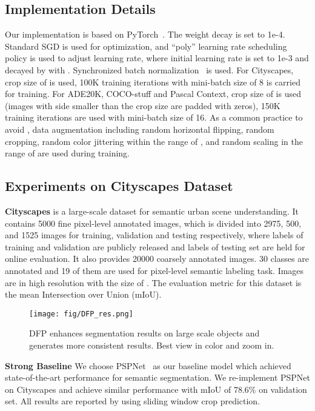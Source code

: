 \documentclass[letterpaper]{article} \usepackage{aaai20}  \usepackage{times}  \usepackage{helvet} \usepackage{courier}  \usepackage[hyphens]{url}  \usepackage{graphicx} \urlstyle{rm} \def\UrlFont{\rm}  \usepackage{graphicx}  \usepackage{amsmath}
\begin{document}
\subsection{Implementation Details}
Our implementation is based on PyTorch~\cite{pytorch}. The weight decay is set to 1e-4. Standard SGD is used for optimization, and ``poly'' learning rate scheduling policy is used to adjust learning rate, where initial learning rate is set to 1e-3 and decayed by 
 with . 
Synchronized batch normalization~\cite{context_encoding} is used. For Cityscapes, crop size of  is used, 100K training iterations with mini-batch size of 8 is carried for training. For ADE20K, COCO-stuff and Pascal Context, crop size of  is used (images with side smaller than the crop size are padded with zeros), 150K training iterations are used with mini-batch size of 16. As a common practice to avoid , data augmentation including random horizontal flipping, random cropping, random color jittering within the range of , and random scaling in the range of  are used during training. 

\subsection{Experiments on Cityscapes Dataset}
\textbf{Cityscapes} is a large-scale dataset for semantic urban scene understanding. It contains 5000 fine pixel-level annotated images, which is divided into 2975, 500, and 1525 images for training, validation and testing respectively, where labels of training and validation are publicly released and labels of testing set are held for online evaluation. It also provides 20000 coarsely annotated images. 30 classes are annotated and 19 of them are used for pixel-level semantic labeling task. Images are in high resolution with the size of . The evaluation metric for this dataset is the mean Intersection over Union (mIoU).





\begin{figure}
\centering
\texttt{[image: fig/DFP\_res.png]}
\caption{DFP enhances segmentation results on large scale objects and generates more consistent results. Best view in color and zoom in.}
\label{fig:dfp_prediction_result}
\end{figure}

\noindent
\textbf{Strong Baseline} We choose PSPNet~\cite{pspnet} as our baseline model which achieved state-of-the-art performance for semantic segmentation. We re-implement PSPNet on Cityscapes and achieve similar performance with mIoU of 78.6\% on validation set. All results are reported by using sliding window crop prediction. 
\end{document}
